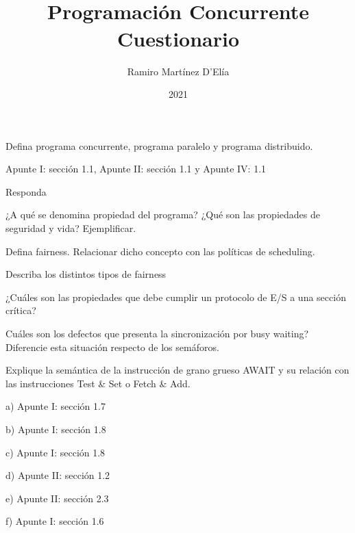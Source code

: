 \documentclass[a4paper, 10pt]{article}
\newenvironment{main_question}
	{\noindent\begin{enumerate}[resume=series-name]\bfseries}
	{\end{enumerate}}
\newenvironment{sub_questions}
	{\noindent\begin{enumerate}[label=\emph{\alph*}), leftmargin=0cm]}
	{\end{enumerate}}
\newenvironment{answer}
	{\noindent\par\normalfont}
	{}
\begin{document}
	
\title{
	\\
	Programación Concurrente\\
	\large Cuestionario
}

\author{Ramiro Martínez D'Elía}
\date{2021}
\maketitle

\begin{main_question}
\item Defina programa concurrente, programa paralelo y programa distribuido.
\end{main_question}
\begin{answer}
Apunte I: sección 1.1, Apunte II: sección 1.1 y Apunte IV: 1.1
\end{answer}
\begin{main_question}
\item Responda
\begin{sub_questions}
	\item ¿A qué se denomina propiedad del programa? ¿Qué son las propiedades de seguridad y vida? Ejemplificar.
	\item Defina fairness. Relacionar dicho concepto con las políticas de scheduling.
	\item Describa los distintos tipos de fairness
	\item ¿Cuáles son las propiedades que debe cumplir un protocolo de E/S a una sección crítica?
	\item Cuáles son los defectos que presenta la sincronización por busy waiting? Diferencie esta situación respecto de los semáforos.
	\item Explique la semántica de la instrucción de grano grueso  AWAIT y su relación con las instrucciones Test \& Set o Fetch \& Add.
\end{sub_questions}
\end{main_question}
\begin{answer}
a) Apunte I: sección 1.7

b) Apunte I: sección 1.8

c) Apunte I: sección 1.8

d) Apunte II: sección 1.2

e) Apunte II: sección 2.3

f) Apunte I: sección 1.6
\end{answer}
\end{document}
